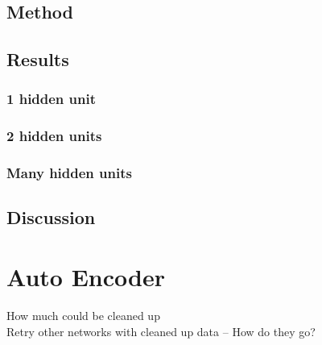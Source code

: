 \subsection{Method}

\subsection{Results}
\subsubsection{1 hidden unit}

\subsubsection{2 hidden units}

\subsubsection{Many hidden units}

\subsection{Discussion}


\section{Auto Encoder}
How much could be cleaned up \\
Retry other networks with cleaned up data -- How do they go? \\

